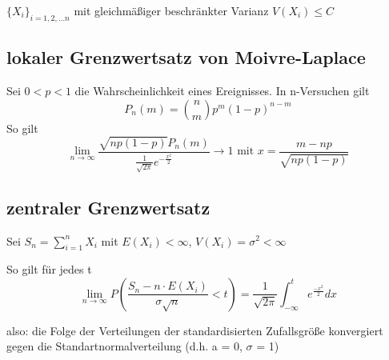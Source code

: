 $\{X_i\}_{i=1,2, \ldots n}$ mit gleichmäßiger beschränkter Varianz  $V(X_i) \leq C$


\subsection{lokaler Grenzwertsatz von Moivre-Laplace}
Sei $0<p<1$ die Wahrscheinlichkeit eines Ereignisses.
In n-Versuchen gilt
\[P_n (m) = \binom{n}{m} p^m(1-p)^{n-m}\] So gilt \[\lim\limits_{n \to \infty} \frac{\sqrt{np(1-p)} P_n(m)}{\frac{1}{\sqrt{2 \pi}} e ^{-\frac{x^2}{2}}} \rightarrow  1 \text{ mit } x=\frac{m-np}{\sqrt{np(1-p)}}\]

\subsection{zentraler Grenzwertsatz}

Sei $S_n =  \sum_{i=1}^{n} X_i$ mit $E(X_i)<\infty$, $V(X_i) = \sigma ^2 < \infty$

So gilt für jedes t
\[ \lim\limits_{n \rightarrow \infty} P \left(\frac{S_n - n \cdot E(X_i)}{\sigma \sqrt{n} }< t\right) = \frac{1}{\sqrt{2\pi} }\int_{-\infty}^{t} e^{\frac{-x^2}{2}} dx
\]

also: die Folge der Verteilungen der standardisierten Zufallsgröße konvergiert gegen die Standartnormalverteilung (d.h. a = 0, $\sigma$ = 1)
